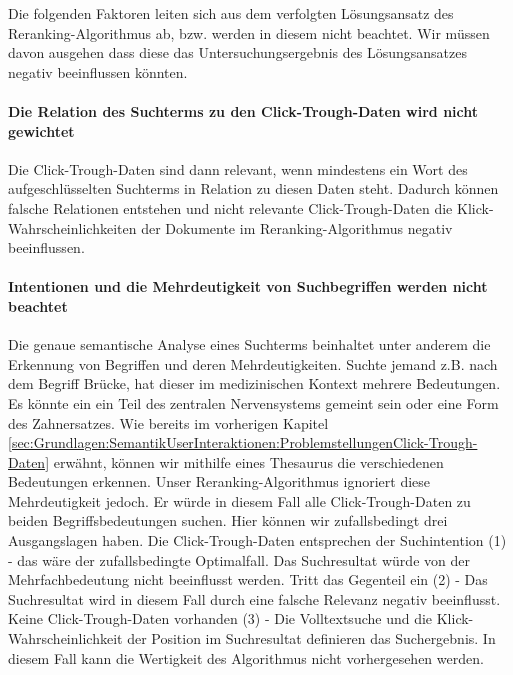 Die folgenden Faktoren leiten sich aus dem verfolgten Lösungsansatz des Reranking-Algorithmus ab, bzw. werden in diesem nicht beachtet. Wir müssen davon ausgehen dass diese das Untersuchungsergebnis des Lösungsansatzes negativ beeinflussen könnten.

\paragraph{Die Relation des Suchterms zu den Click-Trough-Daten wird nicht gewichtet}
Die Click-Trough-Daten sind dann relevant, wenn mindestens ein Wort des aufgeschlüsselten Suchterms in Relation zu diesen Daten steht. Dadurch können falsche Relationen entstehen und nicht relevante Click-Trough-Daten die Klick-Wahrscheinlichkeiten der Dokumente im Reranking-Algorithmus negativ beeinflussen.

\paragraph{Intentionen und die Mehrdeutigkeit von Suchbegriffen werden nicht beachtet}
Die genaue semantische Analyse eines Suchterms beinhaltet unter anderem die Erkennung von Begriffen und deren Mehrdeutigkeiten. Suchte jemand z.B. nach dem Begriff \glqq Brücke\grqq{}, hat dieser im medizinischen Kontext mehrere Bedeutungen. Es könnte ein \glqq ein Teil des zentralen Nervensystems\grqq{} gemeint sein oder eine \glqq Form des Zahnersatzes\grqq{}. Wie bereits im vorherigen Kapitel \ref{sec:Grundlagen:SemantikUserInteraktionen:ProblemstellungenClick-Trough-Daten} erwähnt, können wir mithilfe eines Thesaurus die verschiedenen Bedeutungen erkennen. Unser Reranking-Algorithmus ignoriert diese Mehrdeutigkeit jedoch. Er würde in diesem Fall alle Click-Trough-Daten zu beiden Begriffsbedeutungen suchen. Hier können wir zufallsbedingt drei Ausgangslagen haben. Die Click-Trough-Daten entsprechen der Suchintention (1) - das wäre der zufallsbedingte Optimalfall. Das Suchresultat würde von der Mehrfachbedeutung nicht beeinflusst werden. Tritt das Gegenteil ein (2) - Das Suchresultat wird in diesem Fall durch eine falsche Relevanz negativ beeinflusst. Keine Click-Trough-Daten vorhanden (3) - Die Volltextsuche und die Klick-Wahrscheinlichkeit der Position im Suchresultat definieren das Suchergebnis. In diesem Fall kann die Wertigkeit des Algorithmus nicht vorhergesehen werden.

